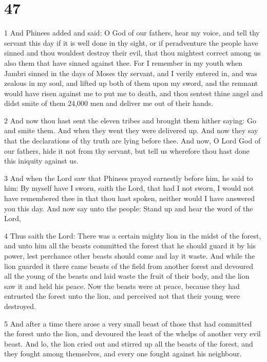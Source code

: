 \chapter{47}

\par 1 And Phinees added and said: O God of our fathers, hear my voice, and tell thy servant this day if it is well done in thy sight, or if peradventure the people have sinned and thou wouldest destroy their evil, that thou mightest correct among us also them that have sinned against thee. For I remember in my youth when Jambri sinned in the days of Moses thy servant, and I verily entered in, and was zealous in my soul, and lifted up both of them upon my sword, and the remnant would have risen against me to put me to death, and thou sentest thine angel and didst smite of them 24,000 men and deliver me out of their hands. 

\par 2 And now thou hast sent the eleven tribes and brought them hither saying: Go and smite them. And when they went they were delivered up. And now they say that the declarations of thy truth are lying before thee. And now, O Lord God of our fathers, hide it not from thy servant, but tell us wherefore thou hast done this iniquity against us. 

\par 3 And when the Lord saw that Phinees prayed earnestly before him, he said to him: By myself have I sworn, saith the Lord, that had I not sworn, I would not have remembered thee in that thou hast spoken, neither would I have answered you this day. And now say unto the people: Stand up and hear the word of the Lord, 

\par 4 Thus saith the Lord: There was a certain mighty lion in the midst of the forest, and unto him all the beasts committed the forest that he should guard it by his power, lest perchance other beasts should come and lay it waste. And while the lion guarded it there came beasts of the field from another forest and devoured all the young of the beasts and laid waste the fruit of their body, and the lion saw it and held his peace. Now the beasts were at peace, because they had entrusted the forest unto the lion, and perceived not that their young were destroyed. 

\par 5 And after a time there arose a very small beast of those that had committed the forest unto the lion, and devoured the least of the whelps of another very evil beast. And lo, the lion cried out and stirred up all the beasts of the forest, and they fought among themselves, and every one fought against his neighbour. 

